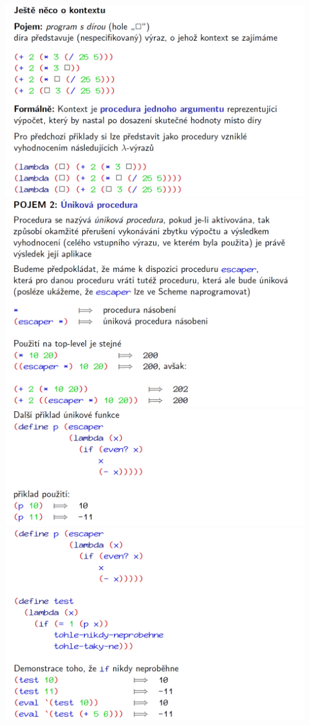 \documentclass[10pt,a4paper]{article}
\begin{document}
\begin{center}
	\includegraphics[scale=0.35]{img/aktualni_pokracovani_4}
	\includegraphics[scale=0.35]{img/aktualni_pokracovani_5}
	\includegraphics[scale=0.35]{img/aktualni_pokracovani_6}
	\includegraphics[scale=0.35]{img/aktualni_pokracovani_7}

\end{center}
\end{document}
